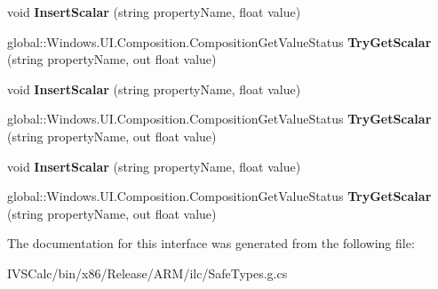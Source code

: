 \begin{DoxyCompactItemize}
void {\bfseries Insert\+Scalar} (string property\+Name, float value)
\item 
\mbox{\label{interface_windows_1_1_u_i_1_1_composition_1_1_i_composition_property_set_ad1dbb6a9859e7c0dfa6e06eb65170b25}} 
global\+::\+Windows.\+U\+I.\+Composition.\+Composition\+Get\+Value\+Status {\bfseries Try\+Get\+Scalar} (string property\+Name, out float value)
\item 
\mbox{\label{interface_windows_1_1_u_i_1_1_composition_1_1_i_composition_property_set_af4dd4487fc38972bfc268e83ad782d5a}} 
void {\bfseries Insert\+Scalar} (string property\+Name, float value)
\item 
\mbox{\label{interface_windows_1_1_u_i_1_1_composition_1_1_i_composition_property_set_ad1dbb6a9859e7c0dfa6e06eb65170b25}} 
global\+::\+Windows.\+U\+I.\+Composition.\+Composition\+Get\+Value\+Status {\bfseries Try\+Get\+Scalar} (string property\+Name, out float value)
\item 
\mbox{\label{interface_windows_1_1_u_i_1_1_composition_1_1_i_composition_property_set_af4dd4487fc38972bfc268e83ad782d5a}} 
void {\bfseries Insert\+Scalar} (string property\+Name, float value)
\item 
\mbox{\label{interface_windows_1_1_u_i_1_1_composition_1_1_i_composition_property_set_ad1dbb6a9859e7c0dfa6e06eb65170b25}} 
global\+::\+Windows.\+U\+I.\+Composition.\+Composition\+Get\+Value\+Status {\bfseries Try\+Get\+Scalar} (string property\+Name, out float value)
\end{DoxyCompactItemize}


The documentation for this interface was generated from the following file\+:\begin{DoxyCompactItemize}
\item 
I\+V\+S\+Calc/bin/x86/\+Release/\+A\+R\+M/ilc/Safe\+Types.\+g.\+cs\end{DoxyCompactItemize}
